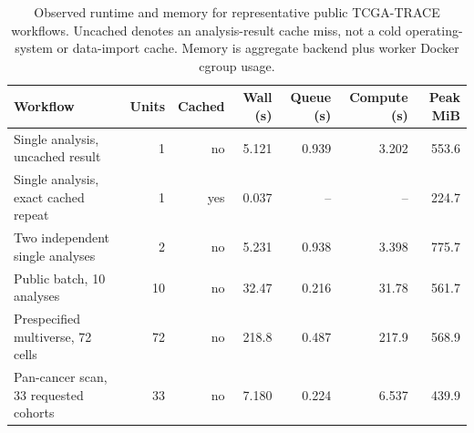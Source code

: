 \begin{table}[t]
\centering
\caption{Observed runtime and memory for representative public TCGA-TRACE workflows. Uncached denotes an analysis-result cache miss, not a cold operating-system or data-import cache. Memory is aggregate backend plus worker Docker cgroup usage.}
\label{tab:runtime-benchmark}
\scriptsize
\begin{tabular}{lrrrrrr}
\toprule
Workflow & Units & Cached & Wall (s) & Queue (s) & Compute (s) & Peak MiB \\
\midrule
Single analysis, uncached result & 1 & no & 5.121 & 0.939 & 3.202 & 553.6 \\
Single analysis, exact cached repeat & 1 & yes & 0.037 & -- & -- & 224.7 \\
Two independent single analyses & 2 & no & 5.231 & 0.938 & 3.398 & 775.7 \\
Public batch, 10 analyses & 10 & no & 32.47 & 0.216 & 31.78 & 561.7 \\
Prespecified multiverse, 72 cells & 72 & no & 218.8 & 0.487 & 217.9 & 568.9 \\
Pan-cancer scan, 33 requested cohorts & 33 & no & 7.180 & 0.224 & 6.537 & 439.9 \\
\bottomrule
\end{tabular}
\end{table}
